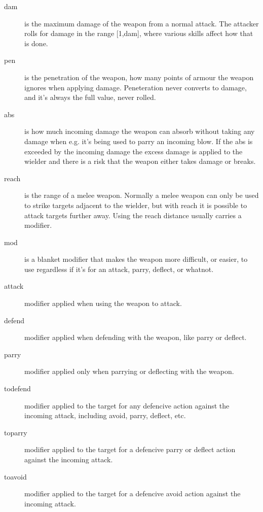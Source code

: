 \begin{description}

\item[dam] is the maximum damage of the weapon from a normal attack. The attacker rolls for damage in the range [1,dam], where various skills affect how that is done.

\item[pen] is the penetration of the weapon, how many points of armour the weapon ignores when applying damage. Peneteration never converts to damage, and it's always the full value, never rolled.

\item[abs] is how much incoming damage the weapon can absorb without taking any damage when e.g. it's being used to parry an incoming blow. If the abs is exceeded by the incoming damage the excess damage is applied to the wielder and there is a risk that the weapon either takes damage or breaks.

\item[reach] is the range of a melee weapon. Normally a melee weapon can only be used to strike targets adjacent to the wielder, but with reach it is possible to attack targets further away. Using the reach distance usually carries a modifier.

\item[mod] is a blanket modifier that makes the weapon more difficult, or easier, to use regardless if it's for an attack, parry, deflect, or whatnot.

\item[attack] modifier applied when using the weapon to attack.

\item[defend] modifier applied when defending with the weapon, like parry or deflect.

\item[parry] modifier applied only when parrying or deflecting with the weapon.

\item[todefend] modifier applied to the target for any defencive action against the incoming attack, including avoid, parry, deflect, etc.

\item[toparry] modifier applied to the target for a defencive parry or deflect action against the incoming attack. 

\item[toavoid] modifier applied to the target for a defencive avoid action against the incoming attack.


\end{description}
